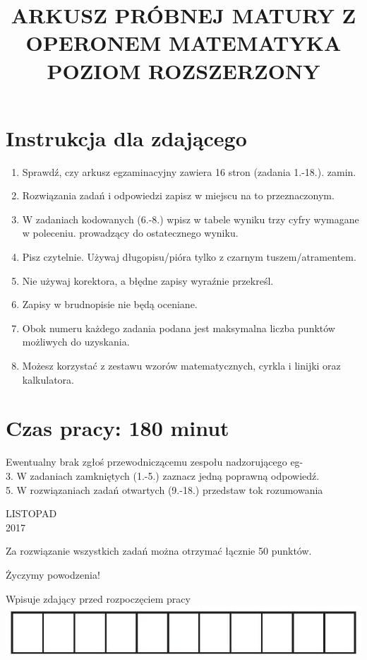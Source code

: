 \documentclass[10pt]{article}
\title{ARKUSZ PRÓBNEJ MATURY Z OPERONEM MATEMATYKA \\
 POZIOM ROZSZERZONY }
\author{}
\date{}
\begin{document}
\maketitle
\section*{Instrukcja dla zdającego}
\begin{enumerate}
  \item Sprawdź, czy arkusz egzaminacyjny zawiera 16 stron (zadania 1.-18.). zamin.
  \item Rozwiązania zadań i odpowiedzi zapisz w miejscu na to przeznaczonym.
  \item W zadaniach kodowanych (6.-8.) wpisz w tabele wyniku trzy cyfry wymagane w poleceniu. prowadzący do ostatecznego wyniku.
  \item Pisz czytelnie. Używaj długopisu/pióra tylko z czarnym tuszem/atramentem.
  \item Nie używaj korektora, a błędne zapisy wyraźnie przekreśl.
  \item Zapisy w brudnopisie nie będą oceniane.
  \item Obok numeru każdego zadania podana jest maksymalna liczba punktów możliwych do uzyskania.
  \item Możesz korzystać z zestawu wzorów matematycznych, cyrkla i linijki oraz kalkulatora.
\end{enumerate}

\section*{Czas pracy: 180 minut}
Ewentualny brak zgłoś przewodniczącemu zespołu nadzorującego eg-\\
3. W zadaniach zamkniętych (1.-5.) zaznacz jedną poprawną odpowiedź.\\
5. W rozwiązaniach zadań otwartych (9.-18.) przedstaw tok rozumowania

LISTOPAD\\
2017

Za rozwiązanie wszystkich zadań można otrzymać łącznie 50 punktów.

Życzymy powodzenia!

Wpisuje zdający przed rozpoczęciem pracy\\
\includegraphics[max width=\textwidth, center]{2024_11_21_06df787f12c5337a1fe8g-01(1)}
\end{document}
